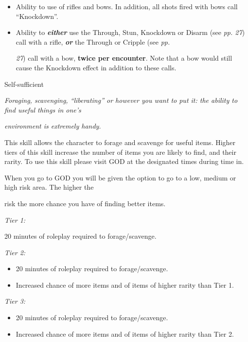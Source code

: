 \documentclass{scrbook}
\begin{document}
\begin{itemize}
\item Ability to use of rifles and bows. In addition, all shots fired with bows call ``Knockdown''.

\item Ability to \textbf{\textit{either}} use the Through, Stun, Knockdown or Disarm (see \textit{pp. 27}) call with a rifle, \textbf{\textit{or}} the Through or Cripple (see \textit{pp.}

\textit{27}) call with a bow, \textbf{twice per encounter}. Note that a bow would still cause the Knockdown effect in addition to these calls.

\end{itemize}
Self-sufficient

\textit{Foraging, scavenging, ``liberating'' or however you want to put it: the ability to find useful things in one's}

\textit{environment is extremely handy.}

This skill allows the character to forage and scavenge for useful items. Higher tiers of this skill increase the number of items you are likely to find, and their rarity. To use this skill please visit GOD at the designated times during time in.

When you go to GOD you will be given the option to go to a low, medium or high risk area. The higher the

risk the more chance you have of finding better items.

\textit{Tier 1:}

20 minutes of roleplay required to forage/scavenge.

\textit{Tier 2:}

\begin{itemize}
\item 20 minutes of roleplay required to forage/scavenge.

\item Increased chance of more items and of items of higher rarity than Tier 1.

\end{itemize}
\textit{Tier 3:}

\begin{itemize}
\item 20 minutes of roleplay required to forage/scavenge.

\item Increased chance of more items and of items of higher rarity than Tier 2.

\end{itemize}
\end{document}
